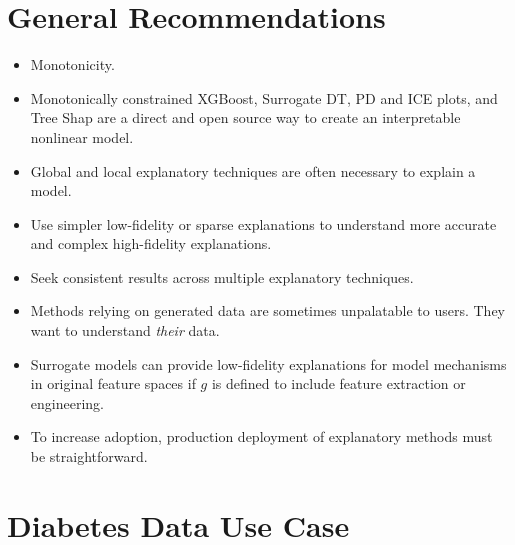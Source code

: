 \documentclass{article}
\begin{document}
\section{General Recommendations} \label{sec:gen_rec}

\begin{itemize}
	
	\item Monotonicity.	
	
	\item Monotonically constrained XGBoost, Surrogate DT, PD and ICE plots, and Tree Shap are a direct and open source way to create an interpretable nonlinear model.
	
	\item Global and local explanatory techniques are often necessary to explain a model.
	
	\item Use simpler low-fidelity or sparse explanations to understand more accurate and complex high-fidelity explanations.  
	
	\item Seek consistent results across multiple explanatory techniques. 
	
	\item Methods relying on generated data are sometimes unpalatable to users. They want to understand \textit{their} data.
	
	\item Surrogate models can provide low-fidelity explanations for model mechanisms in original feature spaces if $g$ is defined to include feature extraction or engineering.
	
	\item To increase adoption, production deployment of explanatory methods must be straightforward.
	
\end{itemize}

\section{Diabetes Data Use Case} \label{sec:use_case}

\end{document}
